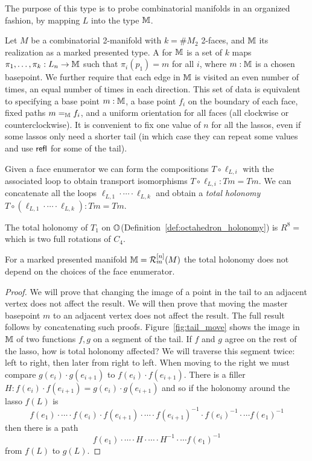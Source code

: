 The purpose of this type is to probe combinatorial manifolds in an organized fashion, by mapping \( L \) into the type \( \mathbb{M} \).

\begin{mydef}
\label{def:face_enumerator}
Let \( M \) be a combinatorial 2-manifold with \( k=\#M_2 \) 2-faces, and \( \mathbb{M} \) its realization as a marked presented type. A  for \( \mathbb{M} \) is a set of \( k \) maps \( \pi_1,\ldots,\pi_k:L_n\to \mathbb{M} \) such that \( \pi_i(p_1)=m \) for all \( i \), where \( m:\mathbb{M} \) is a chosen basepoint. We further require that each edge in \( \mathbb{M} \) is visited an even number of times, an equal number of times in each direction. This set of data is equivalent to specifying a base point \( m:\mathbb{M} \), a base point \( f_i \) on the boundary of each face, fixed paths \( m=_{\mathbb{M}} f_i \), and a uniform orientation for all faces (all clockwise or counterclockwise). It is convenient to fix one value of \( n \) for all the lassos, even if some lassos only need a shorter tail (in which case they can repeat some values and use \( \mathsf{refl} \) for some of the tail).
\end{mydef}

Given a face enumerator we can form the compositions \( T\circ\ell_{L,i} \) with the associated loop to obtain transport isomorphisms \( T\circ\ell_{L,i}:Tm=Tm \). We can concatenate all the loops \( \ell_{L,1}\cdot\cdots\cdot\ell_{L,k} \) and obtain a \emph{total holonomy} \( T\circ(\ell_{L,1}\cdot\cdots\cdot\ell_{L,k}):Tm=Tm  \).

\begin{mylemma}
The total holonomy of \( T_1 \) on \( \mathbb{O} \)(Definition~\ref{def:octahedron_holonomy}) is \( R^8=\) which is two full rotations of \( C_4 \).
\end{mylemma}

\begin{myprop}
For a marked presented manifold \( \mathbb{M}=\mathcal{R}_m^{[n]}(M) \) the total holonomy does not depend on the choices of the face enumerator.
\end{myprop}
\begin{proof}
We will prove that changing the image of a point in the tail to an adjacent vertex does not affect the result. We will then prove that moving the master basepoint \( m \) to an adjacent vertex does not affect the result. The full result follows by concatenating such proofs. Figure~\ref{fig:tail_move} shows the image in \( \mathbb{M} \) of two functions \( f, g \) on a segment of the tail. If \( f \) and \( g \) agree on the rest of the lasso, how is total holonomy affected? We will traverse this segment twice: left to right, then later from right to left. When moving to the right we must compare \( g(e_i)\cdot g(e_{i+1}) \) to \( f(e_i)\cdot f(e_{i+1}) \). There is a filler \( H:f(e_i)\cdot f(e_{i+1})=g(e_i)\cdot g(e_{i+1}) \) and so if the holonomy around the lasso \( f(L) \) is \[ f(e_1)\cdot\cdots\cdot f(e_i)\cdot f(e_{i+1})\cdot\cdots\cdot f(e_{i+1})^{-1}\cdot f(e_i)^{-1}\cdot\cdots f(e_1)^{-1} \] then there is a path \[ f(e_1)\cdot\cdots\cdot H\cdot\cdots\cdot H^{-1}\cdot\cdots f(e_1)^{-1} \] from \( f(L) \) to \( g(L) \).
\end{proof}

